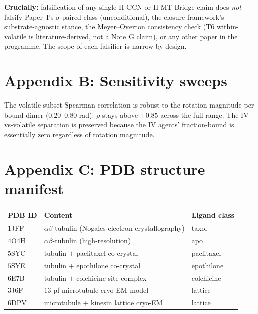 \documentclass[11pt,a4paper]{article}
\begin{document}
\textbf{Crucially:} falsification of any single H-CCN or H-MT-Bridge
claim does \emph{not} falsify Paper~I's $\sigma$-paired class
(unconditional), the closure framework's substrate-agnostic stance,
the Meyer--Overton consistency check (T$6$ within-volatile is
literature-derived, not a Note G claim), or any other paper in the
programme. The scope of each falsifier is narrow by design.

\section*{Appendix B: Sensitivity sweeps}
The volatile-subset Spearman correlation is robust to the rotation
magnitude per bound dimer ($0.20$--$0.80$ rad): $\rho$ stays above
$+0.85$ across the full range. The IV-vs-volatile separation is
preserved because the IV agents' fraction-bound is essentially zero
regardless of rotation magnitude.

\section*{Appendix C: PDB structure manifest}
\begin{tabular}{lll}\toprule
PDB ID & Content & Ligand class \\\midrule
$1$JFF & $\alpha\beta$-tubulin (Nogales electron-crystallography) & taxol \\
$4$O$4$H & $\alpha\beta$-tubulin (high-resolution) & apo \\
$5$SYC & tubulin $+$ paclitaxel co-crystal & paclitaxel \\
$5$SYE & tubulin $+$ epothilone co-crystal & epothilone \\
$6$E$7$B & tubulin $+$ colchicine-site complex & colchicine \\
$3$J$6$F & $13$-pf microtubule cryo-EM model & lattice \\
$6$DPV & microtubule $+$ kinesin lattice cryo-EM & lattice \\
\bottomrule\end{tabular}



\end{document}
